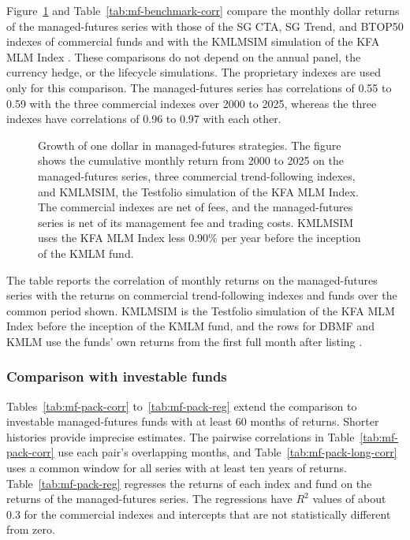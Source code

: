 Figure~\ref{fig:mf-vs-benchmarks} and Table~\ref{tab:mf-benchmark-corr} compare the monthly dollar returns
of the managed-futures series with those of the SG CTA, SG Trend, and BTOP50 indexes of commercial funds
and with the KMLMSIM simulation of the KFA MLM Index \citep{SGIndices,BTOP50,Testfol}. These comparisons do
not depend on the annual panel, the currency hedge, or the lifecycle simulations. The proprietary indexes
are used only for this comparison. The managed-futures series has correlations of 0.55 to 0.59 with the
three commercial indexes over 2000 to 2025, whereas the three indexes have correlations of 0.96 to 0.97
with each other.

\begin{figure}[p]
\centering

\caption{Growth of one dollar in managed-futures strategies. The figure shows the cumulative monthly
return from 2000 to 2025 on the managed-futures series, three commercial trend-following indexes, and
KMLMSIM, the Testfolio simulation of the KFA MLM Index. The commercial indexes are net of fees, and the
managed-futures series is net of its management fee and trading costs. KMLMSIM uses the KFA MLM Index less
0.90\% per year before the inception of the KMLM fund.}
\label{fig:mf-vs-benchmarks}
\end{figure}

\begin{table}[p]
\centering
\caption{Correlations of the managed-futures series with trend-following benchmarks}
\label{tab:mf-benchmark-corr}
\begin{minipage}{\linewidth}\small The table reports the correlation of monthly returns on the
managed-futures series with the returns on commercial trend-following indexes and funds over the common
period shown. KMLMSIM is the Testfolio simulation of the KFA MLM Index before the inception of the KMLM
fund, and the rows for DBMF and KMLM use the funds' own returns from the first full month after listing
\citep{Testfol,YahooFinance}.\end{minipage}
\medskip

\small

\end{table}

\subsubsection{Comparison with investable funds}
\label{app:mf-funds}

Tables~\ref{tab:mf-pack-corr} to~\ref{tab:mf-pack-reg} extend the comparison to investable
managed-futures funds with at least 60 months of returns. Shorter histories provide imprecise estimates.
The pairwise correlations in Table~\ref{tab:mf-pack-corr} use each pair's overlapping months, and
Table~\ref{tab:mf-pack-long-corr} uses a common window for all series with at least ten years of returns.
Table~\ref{tab:mf-pack-reg} regresses the returns of each index and fund on the returns of the
managed-futures series. The regressions have $R^2$ values of about 0.3 for the commercial indexes and
intercepts that are not statistically different from zero.

